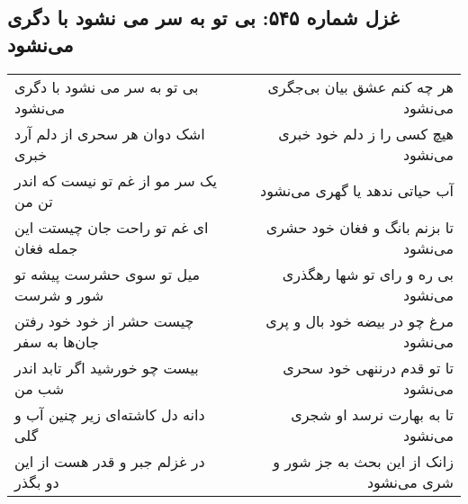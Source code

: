 \begin{center}
\section*{غزل شماره ۵۴۵: بی تو به سر می نشود با دگری می‌نشود}
\label{sec:0545}
\begin{longtable}{l p{0.5cm} r}
بی تو به سر می نشود با دگری می‌نشود
&&
هر چه کنم عشق بیان بی‌جگری می‌نشود
\\
اشک دوان هر سحری از دلم آرد خبری
&&
هیچ کسی را ز دلم خود خبری می‌نشود
\\
یک سر مو از غم تو نیست که اندر تن من
&&
آب حیاتی ندهد یا گهری می‌نشود
\\
ای غم تو راحت جان چیستت این جمله فغان
&&
تا بزنم بانگ و فغان خود حشری می‌نشود
\\
میل تو سوی حشرست پیشه تو شور و شرست
&&
بی ره و رای تو شها رهگذری می‌نشود
\\
چیست حشر از خود خود رفتن جان‌ها به سفر
&&
مرغ چو در بیضه خود بال و پری می‌نشود
\\
بیست چو خورشید اگر تابد اندر شب من
&&
تا تو قدم درننهی خود سحری می‌نشود
\\
دانه دل کاشته‌ای زیر چنین آب و گلی
&&
تا به بهارت نرسد او شجری می‌نشود
\\
در غزلم جبر و قدر هست از این دو بگذر
&&
زانک از این بحث به جز شور و شری می‌نشود
\\
\end{longtable}
\end{center}
